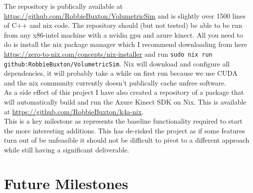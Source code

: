 The repository is publically available at \url{https://github.com/RobbieBuxton/VolumetricSim} and is slightly over 1500 lines of C++ and nix code. The repository should (but not tested) be able to be run from any x86-intel machine with a nvidia gpu and azure kinect. All you need to do is install the nix package manager which I recommend downloading from here \url{https://zero-to-nix.com/concepts/nix-installer} and run \texttt{sudo nix run github:RobbieBuxton/VolumetricSim}. Nix will download and configure all dependencies, it will probably take a while on first run because we use CUDA and the nix community currently doesn't publically cache unfree software. \\

As a side effect of this project I have also created a repository of a package that will automatically build and run the Azure Kinect SDK on Nix. This is available at \url{https://github.com/RobbieBuxton/k4a-nix}. \\

This is a key milestone as represents the baseline functionality required to start the more interesting additions. This has de-risked the project as if some features turn out of be unfeasible it should not be difficult to pivot to a different approach while still having a significant deliverable.

\section{Future Milestones}
